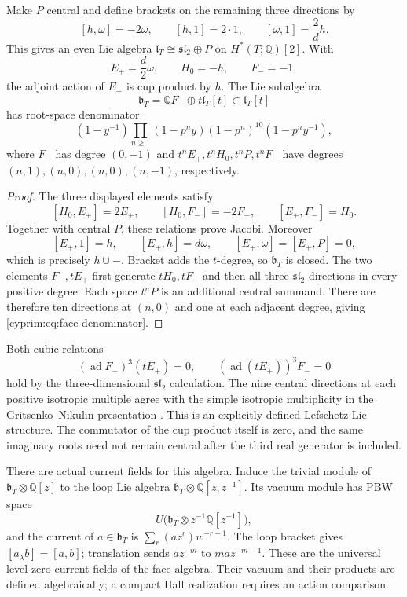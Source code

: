 \begin{proposition}\label{cyprim:prop:face}
Make $P$ central and define brackets on the remaining three
directions by
\begin{equation}\label{cyprim:eq:face-bracket}
 [h,\omega]=-2\omega,\qquad [h,1]=2\cdot1,
 \qquad [\omega,1]=\frac2d h.
\end{equation}
This gives an even Lie algebra $\mathfrak l_T\cong\mathfrak{sl}_2\oplus P$
on $H^*(T;\mathbb Q)[2]$. With
\[
 E_+=\frac d2\omega,\qquad H_0=-h,\qquad F_-=-1,
\]
the adjoint action of $E_+$ is cup product by $h$.
The Lie subalgebra
\[
 \mathfrak b_T=\mathbb QF_-\oplus t\mathfrak l_T[t]
 \subset\mathfrak l_T[t]
\]
has root-space denominator
\begin{equation}\label{cyprim:eq:face-denominator}
 (1-y^{-1})\prod_{n\ge1}
       (1-p^ny)(1-p^n)^{10}(1-p^ny^{-1}),
\end{equation}
where $F_-$ has degree $(0,-1)$ and $t^nE_+,t^nH_0,t^nP,t^nF_-$
have degrees $(n,1),(n,0),(n,0),(n,-1)$, respectively.
\end{proposition}

\begin{proof}
The three displayed elements satisfy
\[
 [H_0,E_+]=2E_+,
 \qquad [H_0,F_-]=-2F_-,
 \qquad [E_+,F_-]=H_0.
\]
Together with central $P$, these relations prove Jacobi.
Moreover
\[
 [E_+,1]=h,\qquad [E_+,h]=d\omega,
 \qquad [E_+,\omega]=[E_+,P]=0,
\]
which is precisely $h\cup-$. Bracket adds the $t$-degree, so
$\mathfrak b_T$ is closed. The two elements $F_-,tE_+$ first
generate $tH_0,tF_-$ and then all three $\mathfrak{sl}_2$ directions
in every positive degree. Each space $t^nP$ is an additional
central summand. There are therefore ten directions at $(n,0)$
and one at each adjacent degree, giving
\eqref{cyprim:eq:face-denominator}.
\end{proof}

Both cubic relations
\[
 (\operatorname{ad}F_-)^3(tE_+)=0,
 \qquad (\operatorname{ad}(tE_+))^3F_-=0
\]
hold by the three-dimensional $\mathfrak{sl}_2$ calculation.
The nine central directions at each positive isotropic multiple
agree with the simple isotropic multiplicity in the
Gritsenko--Nikulin presentation \cite[Theorem~2.3]{GN97}.
This is an explicitly defined Lefschetz Lie structure. The
commutator of the cup product itself is zero, and the same
imaginary roots need not remain central after the third real
generator is included.

There are actual current fields for this algebra. Induce the
trivial module of $\mathfrak b_T\otimes\mathbb Q[z]$ to the loop
Lie algebra $\mathfrak b_T\otimes\mathbb Q[z,z^{-1}]$. Its vacuum
module has PBW space
\[
 U\bigl(\mathfrak b_T\otimes z^{-1}\mathbb Q[z^{-1}]\bigr),
\]
and the current of $a\in\mathfrak b_T$ is
$\sum_r(az^r)w^{-r-1}$. The loop bracket gives
$[a_\lambda b]=[a,b]$; translation sends $az^{-m}$ to
$m az^{-m-1}$. These are the universal level-zero current
fields of the face algebra. Their vacuum and their products
are defined algebraically; a compact Hall realization requires
an action comparison.


